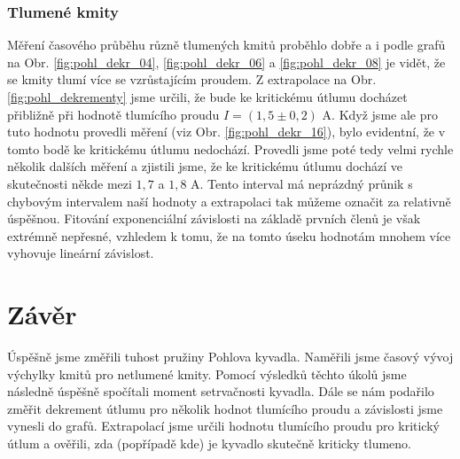 \documentclass[english]{article}
\begin{document}
	\subsubsection{Tlumené kmity}
		Měření časového průběhu různě tlumených kmitů proběhlo dobře a i podle grafů na Obr. \ref{fig:pohl_dekr_04}, \ref{fig:pohl_dekr_06} a \ref{fig:pohl_dekr_08} je vidět, že se kmity tlumí více se vzrůstajícím proudem. Z extrapolace na Obr. \ref{fig:pohl_dekrementy} jsme určili, že bude ke kritickému útlumu docházet přibližně při hodnotě tlumícího proudu $I = (1,5\pm0,2)$ A. Když jsme ale pro tuto hodnotu provedli měření (viz Obr. \ref{fig:pohl_dekr_16}), bylo evidentní, že v tomto bodě ke kritickému útlumu nedochází. Provedli jsme poté tedy velmi rychle několik dalších měření a zjistili jsme, že ke kritickému útlumu dochází ve skutečnosti někde mezi $1,7$ a $1,8$ A. Tento interval má neprázdný průnik s chybovým intervalem naší hodnoty a extrapolaci tak můžeme označit za relativně úspěšnou. Fitování exponenciální závislosti na základě prvních členů je však extrémně nepřesné, vzhledem k tomu, že na tomto úseku hodnotám mnohem více vyhovuje lineární závislost. 
\section{Závěr}
	Úspěšně jsme změřili tuhost pružiny Pohlova kyvadla. Naměřili jsme časový vývoj výchylky kmitů pro netlumené kmity. Pomocí výsledků těchto úkolů jsme následně úspěšně spočítali moment setrvačnosti kyvadla. Dále se nám podařilo změřit dekrement útlumu pro několik hodnot tlumícího proudu a závislosti jsme vynesli do grafů. Extrapolací jsme určili hodnotu tlumícího proudu pro kritický útlum a ověřili, zda (popřípadě kde)  je kyvadlo skutečně kriticky tlumeno.
	
\begingroup
\end{document}
